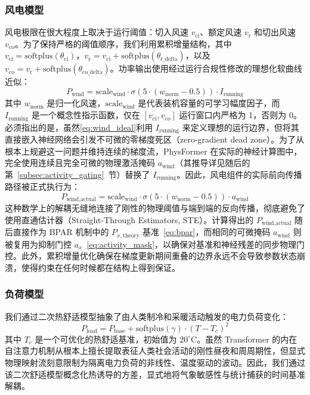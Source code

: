 \subsubsection{风电模型}
风电极限在很大程度上取决于运行阈值：切入风速 $v_{\text{ci}}$、额定风速 $v_{\text{r}}$ 和切出风速 $v_{\text{co}}$。为了保持严格的阈值顺序，我们利用累积增量结构，其中 $v_{\text{ci}} = \text{softplus}(\theta_{\text{ci}})$，$v_{\text{r}} = v_{\text{ci}} + \text{softplus}(\theta_{\text{r\_delta}})$，以及 $v_{\text{co}} = v_{\text{r}} + \text{softplus}(\theta_{\text{co\_delta}})$。功率输出使用经过运行合规性修改的理想化软曲线近似：
\begin{equation}
    P_{\text{wind}} = \text{scale}_{\text{wind}} \cdot \sigma(5 \cdot (w_{\text{norm}} - 0.5)) \cdot I_{\text{running}}
\label{eq:wind_ideal}
\end{equation}
其中 $w_{\text{norm}}$ 是归一化风速，$\text{scale}_{\text{wind}}$ 是代表装机容量的可学习幅度因子，而 $I_{\text{running}}$ 是一个概念性指示函数，仅在 $[v_{\text{ci}}, v_{\text{co}}]$ 运行窗口内严格为 1，否则为 0。必须指出的是，虽然\eqref{eq:wind_ideal}利用 $I_{\text{running}}$ 来定义理想的运行边界，但将其直接嵌入神经网络会引发不可微的零梯度死区（zero-gradient dead zone）。为了从根本上规避这一问题并维持连续的梯度流，PhysFormer 在实际的神经计算图中，完全使用连续且完全可微的物理激活掩码 $a_{\text{wind}}$（其推导详见随后的第~\ref{subsec:activity_gating}~节）替换了 $I_{\text{running}}$。因此，风电组件的实际前向传播路径被正式执行为：
\begin{equation}
    P_{\text{wind,actual}} = \text{scale}_{\text{wind}} \cdot \sigma(5 \cdot (w_{\text{norm}} - 0.5)) \cdot a_{\text{wind}}
\label{eq:wind_actual}
\end{equation}
这种数学上的解耦无缝地连接了刚性的物理阈值与端到端的反向传播，彻底避免了使用直通估计器（Straight-Through Estimators, STE）。计算得出的 $P_{\text{wind,actual}}$ 随后直接作为 BPAR 机制中的 $P_{x,\text{theory}}$ 基准~\eqref{eq:bpar}，而相同的可微掩码 $a_{\text{wind}}$ 则被复用为抑制门控 $a_x$~\eqref{eq:activity_mask}，以确保对基准和神经残差的同步物理门控。此外，累积增量优化确保在梯度更新期间重叠的边界永远不会导致参数状态崩溃，使得约束在任何时候都在结构上得到保证。

\subsubsection{负荷模型}
我们通过二次热舒适模型抽象了由人类制冷和采暖活动触发的电力负荷变化：
\begin{equation}
    P_{\text{load}} = P_{\text{base}} + \text{softplus}(\gamma) \cdot (T - T_c)^2
\label{eq:load_model}
\end{equation}
其中 $T_c$ 是一个可优化的热舒适基准，初始值为 $20^\circ\text{C}$。虽然 Transformer 的内在自注意力机制从根本上擅长提取表征人类社会活动的刚性昼夜和周周期性，但显式物理映射流刻意限制为隔离电力负荷的非线性、温度驱动的波动。因此，我们通过该二次舒适模型概念化热诱导的方差，显式地将气象敏感性与统计捕获的时间基准解耦。

